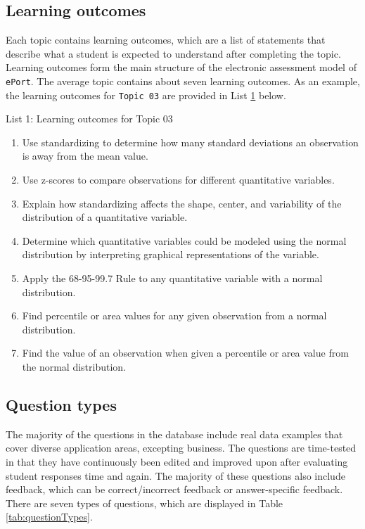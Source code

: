 \documentclass[11pt,a4paper,oldfontcommands,openany]{memoir}
\numberwithin{equation}{section} %
\begin{document}
\subsection{Learning outcomes}

Each topic contains learning outcomes, which are a list of statements that describe what a student is expected to understand after completing the topic. Learning outcomes form the main structure of the electronic assessment model of \texttt{ePort}. The average topic contains about seven learning outcomes. As an example, the learning outcomes for \texttt{Topic 03} are provided in List \hyperref[sec:lo]{1} below.

\newpage
\centerline{List 1: Learning outcomes for Topic 03}
\vspace{-2mm}
\begin{framed}
\begin{enumerate}[label=\Alph*.]
\label{sec:lo}
\item Use standardizing to determine how many standard deviations an observation is away from the mean value.
\item Use z-scores to compare observations for different quantitative variables.
\item Explain how standardizing affects the shape, center, and variability of the distribution of a quantitative variable.
\item Determine which quantitative variables could be modeled using the normal distribution by interpreting graphical representations of the variable.
\item Apply the 68-95-99.7 Rule to any quantitative variable with a normal distribution.
\item Find percentile or area values for any given observation from a normal distribution.
\item Find the value of an observation when given a percentile or area value from the normal distribution.
\end{enumerate}
\end{framed}

\subsection{Question types}

The majority of the questions in the database include real data examples that cover diverse application areas, excepting business. The questions are time-tested in that they have continuously been edited and improved upon after evaluating student responses time and again. The majority of these questions also include feedback, which can be correct/incorrect feedback or answer-specific feedback. There are seven types of questions, which are displayed in Table \ref{tab:questionTypes}.
\end{document}
